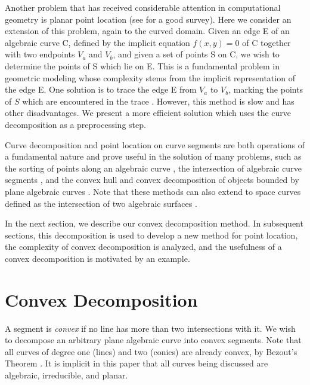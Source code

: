Another problem that has received considerable attention in computational
geometry is planar point location (see \cite{prepsham85} for a good
survey). 
Here we consider an extension of this problem, again to the curved domain.
Given an edge E of an algebraic curve C,
defined by the implicit equation $f(x,y) = 0$ of C together with
two endpoints $V_{a}$ and $V_{b}$, and
given a set of points S on C, we wish to determine the points of S
which lie on E.
This is a fundamental problem in geometric modeling whose complexity stems
from the implicit representation of the edge E.
One solution is to trace the edge E from $V_{a}$ to $V_{b}$,
marking the points of $S$ which are encountered in the trace \cite{bhhl}.
However, this method is slow and has other 
disadvantages.
We present a more efficient solution which uses the curve decomposition as
a preprocessing step.

Curve decomposition and point location on curve segments are both
operations of a fundamental nature and prove useful in the solution of many 
problems, such as the sorting of points along an algebraic curve \cite{jj},
the intersection of algebraic curve segments \cite{gj87}, and the convex hull 
and convex decomposition of objects bounded by plane algebraic curves 
\cite{bajkim87a,bajkim87b}.
Note that these methods can also extend to space curves defined as the
intersection of two algebraic surfaces \cite{abba4,jj}.

In the next section, we describe our convex decomposition method.
In subsequent sections, this decomposition is used to develop a new
method for point location, the complexity of convex decomposition is analyzed,
and the usefulness of a convex decomposition is motivated by an example.

\section{Convex Decomposition}

A segment is {\em convex} if no line has more than two intersections with it.
We wish to decompose an arbitrary plane algebraic curve into convex segments.
Note that all curves of degree one (lines) and two (conics) are already convex,
by Bezout's Theorem \cite{walker}.
It is implicit in this paper that all curves being discussed are algebraic,
irreducible, and planar.

